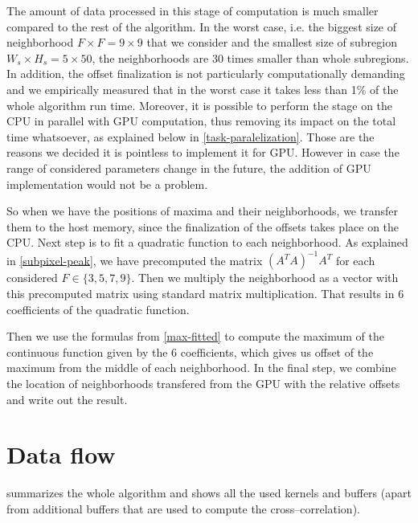 The amount of data processed in this stage of computation is much smaller compared to the rest of the algorithm. In the worst case, i.e. the biggest size of neighborhood $F \times F = 9 \times 9$ that we consider and the smallest size of subregion $W_s \times H_s = 5 \times 50$, the neighborhoods are 30 times smaller than whole subregions. In addition, the offset finalization is not particularly computationally demanding and we empirically measured that in the worst case it takes less than 1\% of the whole algorithm run time. Moreover, it is possible to perform the stage on the CPU in parallel with GPU computation, thus removing its impact on the total time whatsoever, as explained below in \cref{task-paralelization}. Those are the reasons we decided it is pointless to implement it for GPU. However in case the range of considered parameters change in the future, the addition of GPU implementation would not be a problem.

So when we have the positions of maxima and their neighborhoods, we transfer them to the host memory, since the finalization of the offsets takes place on the CPU. Next step is to fit a quadratic function to each neighborhood. As explained in \cref{subpixel-peak}, we have precomputed the matrix $(A^TA)^{-1}A^T$ for each considered $F \in \{3, 5, 7, 9\}$. Then we multiply the neighborhood as a vector with this precomputed matrix using standard matrix multiplication. That results in 6 coefficients of the quadratic function.

Then we use the formulas from \cref{max-fitted} to compute the maximum of the continuous function given by the 6 coefficients, which gives us offset of the maximum from the middle of each neighborhood. In the final step, we combine the location of neighborhoods transfered from the GPU with the relative offsets and write out the result.


\section{Data flow}

 summarizes the whole algorithm and shows all the used kernels and buffers (apart from additional buffers that are used to compute the cross--correlation).

